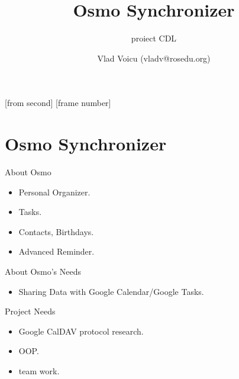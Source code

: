 \documentclass{beamer}
\title[Osmo]{Osmo Synchronizer }
\subtitle{proiect CDL}
\institute[ROSEdu]{ROSEdu}
\author[VV]{Vlad Voicu (vladv@rosedu.org)}
\begin{document}
[from second]
[frame number]

\frame{\titlepage}

\section{Osmo Synchronizer}

\begin{frame}{About Osmo}
	\begin{itemize}
        \item Personal Organizer.
        \item Tasks.
        \item Contacts, Birthdays.
        \item Advanced Reminder.
	\end{itemize}
\end{frame}

\begin{frame}{About Osmo's Needs}
  \begin{itemize}
    \item Sharing Data with Google Calendar/Google Tasks.
  \end{itemize}
\end{frame}

\begin{frame}{Project Needs}
  \begin{itemize}
    \item Google CalDAV protocol research.
    \item OOP.
	\item team work.
  \end{itemize}
\end{frame}
\end{document}
